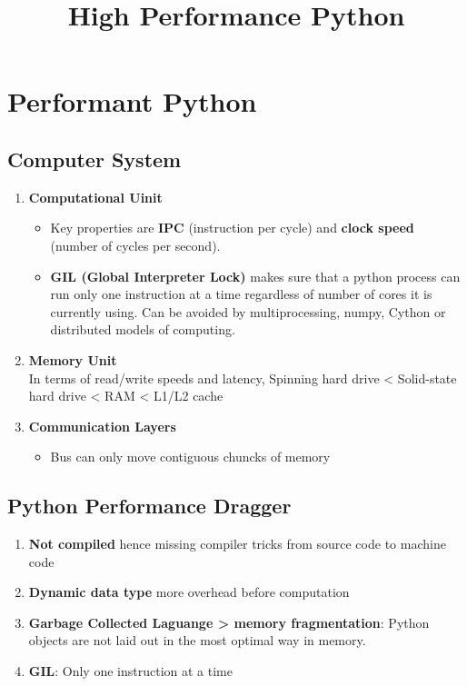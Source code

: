 \documentclass{article}
\title{High Performance Python } %
\begin{document}
\maketitle
\tableofcontents


\section{Performant Python}
	
	\subsection{Computer System}
		\begin{enumerate}
			\item {\bf Computational Uinit} 
				\begin{itemize}
					\item Key properties are {\bf IPC} (instruction per cycle) and {\bf clock speed} (number of cycles per second).
					\item {\bf GIL (Global Interpreter Lock)} makes sure that a python process can run only one instruction at a time regardless of number of cores it is currently using. Can be avoided by multiprocessing, numpy, Cython or distributed models of computing.
				\end{itemize}
			\item {\bf Memory Unit} 
				\\ In terms of read/write speeds and latency, Spinning hard drive < Solid-state hard drive < RAM < L1/L2 cache
			\item {\bf Communication Layers}
				\begin{itemize}
					\item Bus can only move contiguous chuncks of memory
				\end{itemize}
		\end{enumerate}
	\subsection{Python Performance Dragger}
		\begin{enumerate}
			\item {\bf Not compiled} hence missing compiler tricks from source code to machine code
			\item {\bf Dynamic data type} more overhead before computation
			\item {\bf Garbage Collected Laguange \-> memory fragmentation}: Python objects are not laid out in the most optimal way in memory.
			\item {\bf GIL}: Only one instruction at a time

		\end{enumerate}
\end{document}
